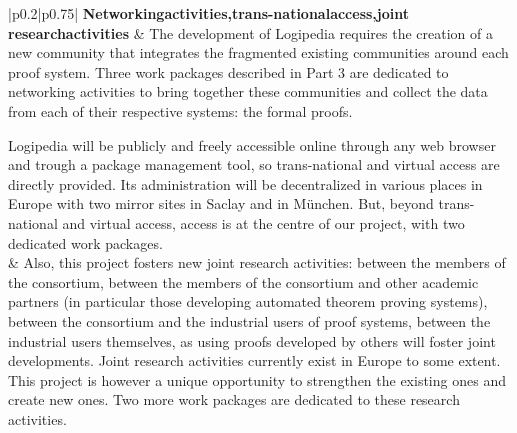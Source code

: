 \begin{longtable*}{|p{0.2\textwidth}|p{0.75\textwidth}|}
{\bf Networking\newline activities,\newline trans-national\newline access,\newline joint research\newline activities}
&
The development of Logipedia requires the creation of a new community that
integrates the fragmented existing communities around each proof system.
Three work packages described in Part 3
are dedicated to networking activities
to bring together these communities and collect the data from each of
their respective systems: the formal proofs.

\hspace{0.4cm}
Logipedia will be publicly and freely accessible online through any
web browser and trough a package management tool, so trans-national
and virtual access are directly provided. Its administration will be
decentralized in various places in Europe with two mirror sites in
Saclay and in M\"unchen. But, beyond trans-national and virtual
access, access is at the centre of our project, with two dedicated
work packages.\\
&
\hspace{0.4cm}
Also, this project fosters new joint research activities:
between the members of the consortium, between the members of
the consortium and other academic partners (in particular those
developing automated theorem proving systems), between the
consortium and the industrial users of proof systems, between
the industrial users themselves, as using proofs developed by others
will foster joint developments.  Joint research activities
currently exist in Europe to some extent.  This project is however a
unique opportunity to strengthen the existing ones and create new
ones. Two more work packages are dedicated
to these research activities.  
\\
\hline


\end{longtable*}
